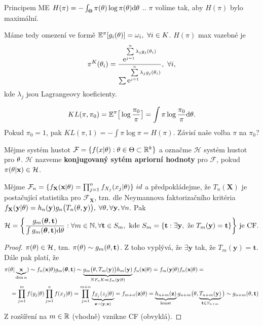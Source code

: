 Principem ME $H(\pi)=-\int_\Theta\pi(\theta)\log \pi(\theta)\mathrm{d}\theta$ .. $\pi$ volíme tak, aby $H(\pi)$ bylo maximální.


Máme tedy omezení ve formě $\mathbb{E}^\pi[g_i(\theta)]=\omega_i,~\forall i\in K$. $H(\pi)$ max vazebné je $$\pi^K(\theta_i)=\frac{\mathrm{e}^{\sum\limits_{j=1}^{n} \lambda_j g_j(\theta_i)}}{\sum \mathrm{e}^{\sum\limits_{j=1}^{n} \lambda_jg_j(\theta_i)}},~\forall i,$$
kde $\lambda_j$ jsou Lagrangeovy koeficienty.

$$ KL(\pi,\pi_0)=\mathbb{E}^\pi\big[\log\frac{\pi_0}{\pi}\big]=\int\pi\log\frac{\pi_0}{\pi}\mathrm{d}\theta.$$
Pokud $\pi_0=1$, pak $KL(\pi,1)=-\int\pi\log\pi=H(\pi)$. Závisí naše volba $\pi$ na $\pi_0$?

\begin{define}
	Mějme systém hustot $\mathcal{F}=\{f(x|\theta):\theta\in\Theta\subset\mathbb{R}^k\}$ a označme $\mathcal{H}$ systém hustot pro $\theta$. $\mathcal{H}$ nazveme \textbf{konjugovaný sytém apriorní hodnoty} pro $\mathcal{F}$, pokud $\pi(\theta|\textbf{x})\in\mathcal{H}$.
\end{define}
\begin{theorem}
	Mějme $\mathcal{F}_n=\{f_{\textbf{X}}(\textbf{x}|\theta)=\prod_{j=1}^n f_{X_j}(x_j|\theta)\} ~id$ a předpokládejme, že $T_n(\textbf{X})$ je postačující statistika pro $\mathcal{F}_\textbf{X}$, tzn. dle Neymannova faktorizačního kritéria $f_{\textbf{X}}(\textbf{y}|\theta)=h_n(\textbf{y})g_n\big(T_n(\theta,\textbf{y})\big),$ $\forall\theta,\forall\textbf{y},\forall n$. Pak $$\mathcal{H}=\bigg\{\frac{g_m(\boldsymbol{\theta},\textbf{t})}{\int g_m(\boldsymbol{\theta},\textbf{t})\mathrm{d}\theta}:\forall m\in\mathbb{N},\forall\textbf{t}\in S_m,\text{ kde }S_m=\{\textbf{t}:\exists\textbf{y},\text{ že }T_m(\textbf{y})=\textbf{t}\}\bigg\}\text{ je CF.}$$
	\begin{proof}
		$\pi(\theta)\in\mathcal{H}$, tzn. $\pi(\theta)\sim g_m(\theta,\textbf{t})$. Z toho vyplývá, že $\exists\textbf{y}$ tak, že $T_m(\textbf{y})=\textbf{t}$. Dále pak platí, že \[
		\begin{split}
		\pi(&\theta|\underbrace{\textbf{x}}_{\dim n})\sim f_n(\textbf{x}|\theta)g_m(\boldsymbol{\theta},\textbf{t})\sim \underbrace{g_m\big(\theta,T_m(\textbf{y})\big)h_m(\textbf{y})}_{NF_nK\Rightarrow f_m(\textbf{y}|\theta)}f_n(\textbf{x}|\theta)=f_m(\textbf{y}|\theta)f_n(\textbf{x}|\theta)=\\&=\prod_{j=1}^mf(y_j|\theta)\prod_{j=1}^nf(x_j|\theta)=\prod_{j=1}^{m+n}\underbrace{f_{Z_j}(z_j|\theta)}_{\textbf{z}=(\textbf{y},\textbf{x})}=f_{m+n}(\textbf{z}|\theta)=\underbrace{h_{n+m}(\textbf{z})}_{\text{konst}}g_{n+m}\big(\theta,\underbrace{T_{n+m}(\textbf{y})}_{\textbf{t}\in S_{n+m}}\big)\sim g_{n+m}(\theta,\textbf{t})
		\end{split}
		\]
		Z rozšíření na $m\in\mathbb{R}$ (vhodně) vznikne CF (obvyklá).
	\end{proof}
\end{theorem}
